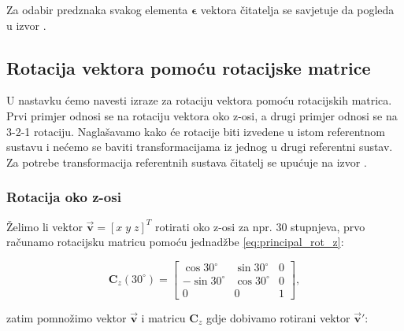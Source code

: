 \documentclass[times, utf8, diplomski, numeric]{templates/template}
\begin{document}
{{{{                Za odabir predznaka svakog elementa $\boldsymbol\epsilon$ vektora čitatelja se savjetuje da pogleda u izvor \cite{adcsKnjiga}.
            }
        }

        \subsection{Rotacija vektora pomoću rotacijske matrice}{
            U nastavku ćemo navesti izraze za rotaciju vektora pomoću rotacijskih matrica. Prvi primjer odnosi se na rotaciju vektora oko z-osi, a drugi primjer odnosi se na 3-2-1 rotaciju. Naglašavamo kako će rotacije biti izvedene u istom referentnom sustavu i nećemo se baviti transformacijama iz jednog u drugi referentni sustav. Za potrebe transformacija referentnih sustava čitatelj se upućuje na izvor \cite{adcsKnjiga}.

            \subsubsection{Rotacija oko z-osi}{
                Želimo li vektor $\overrightarrow{\boldsymbol{v}}=\left[ x \; y \; z \right]^T$ rotirati oko z-osi za npr. 30 stupnjeva, prvo računamo rotacijsku matricu pomoću jednadžbe \ref{eq:principal_rot_z}:

                \begin{equation}
                \boldsymbol{C}_{z}(30^{\circ}) = 
                \begin{bmatrix}
                    \cos30^{\circ}   & \sin30^{\circ}    &  0 \\
                    -\sin30^{\circ}  & \cos30^{\circ}    &  0 \\
                    0                & 0                 &  1
                \end{bmatrix}
                ,
                \end{equation}

                zatim pomnožimo vektor $\overrightarrow{\boldsymbol{v}}$ i matricu $\boldsymbol{C}_{z}$ gdje dobivamo rotirani vektor $\overrightarrow{\boldsymbol{v}}'$:

}}}}
\end{document}
